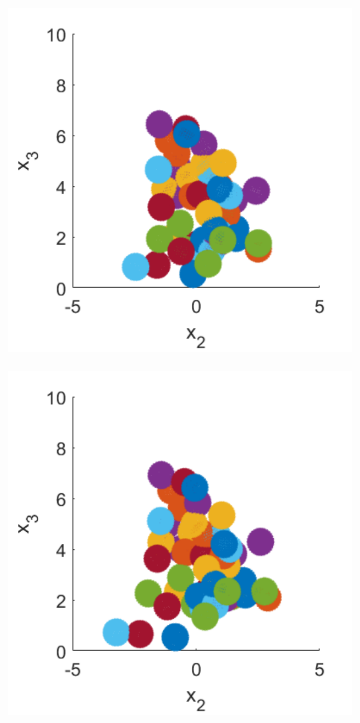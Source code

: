 \begin{figure}
\begin{subfigure}[b]{0.2\textwidth}
    \caption[]{\label{fig:squirmerPosB}}
\end{subfigure}\hfill
\begin{subfigure}[b]{0.2\textwidth}
    \centering
    \includegraphics[width=\textwidth]{Images/squirmers/Gyro-3-All.pdf}
    \caption[]{\label{fig:squirmerPosC}}
\end{subfigure}\hfill
\begin{subfigure}[b]{0.2\textwidth}
    \centering
    \includegraphics[width=\textwidth]{Images/squirmers/Gyro-4-All.pdf}

\end{subfigure}
\end{figure}
